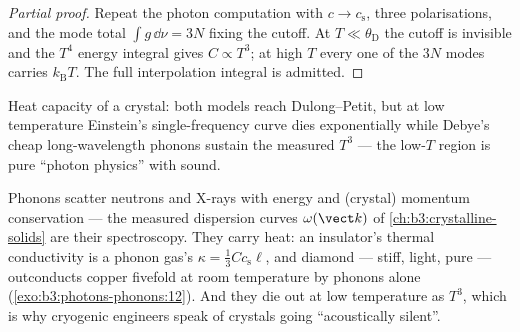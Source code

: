 \begin{proof}[Partial proof]
Repeat the photon computation with $c \to c_{\text{s}}$, three
polarisations, and the mode total $\int g\,\dd\nu = 3N$ fixing the
cutoff. At $T \ll \theta_{\text{D}}$ the cutoff is invisible and
the $T^4$ energy integral gives $C \propto T^3$; at high $T$ every
one of the $3N$ modes carries $k_{\text{B}}T$. The full
interpolation integral is admitted.
\end{proof}

\begin{omfigure}

{\small Heat capacity of a crystal: both models reach
Dulong--Petit, but at low temperature Einstein's single-frequency
curve dies exponentially while Debye's cheap long-wavelength
phonons sustain the measured $T^3$ --- the low-$T$ region is pure
``photon physics'' with sound.}
\end{omfigure}

\begin{example}\label{ex:b3:photons-phonons:phonon-real}
Phonons scatter neutrons and X-rays with energy and (crystal)
momentum conservation --- the measured dispersion curves
$\omega(\vect k)$ of \cref{ch:b3:crystalline-solids} are their
spectroscopy. They carry heat: an insulator's thermal conductivity
is a phonon gas's $\kappa = \tfrac13 Cc_{\text{s}}\ell$, and
diamond --- stiff, light, pure --- outconducts copper fivefold at
room temperature by phonons alone
(\cref{exo:b3:photons-phonons:12}). And they die out at low
temperature as $T^3$, which is why cryogenic engineers speak of
crystals going ``acoustically silent''.
\end{example}

